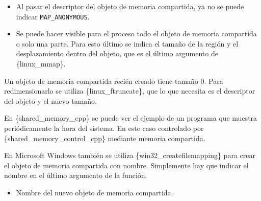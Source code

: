 \begin{itemize}
\item
  Al pasar el descriptor del objeto de memoria compartida, ya no se
  puede indicar \texttt{MAP\_ANONYMOUS}.
\item
  Se puede hacer visible para el proceso todo el objeto de memoria
  compartida o solo una parte. Para esto último se indica el tamaño de
  la región y el desplazamiento dentro del objeto, que es el último
  argumento de \{linux\_mmap\}.
\end{itemize}

Un objeto de memoria compartida recién creado tiene tamaño 0. Para
redimensionarlo se utiliza \{linux\_ftruncate\}, que lo que necesita es
el descriptor del objeto y el nuevo tamaño.

En \{shared\_memory\_cpp\} se puede ver el ejemplo de un programa que
muestra periódicamente la hora del sistema. En este caso controlado por
\{shared\_memory\_control\_cpp\} mediante memoria compartida.

En Microsoft Windows también se utiliza \{win32\_createfilemapping\}
para crear el objeto de memoria compartida con nombre. Simplemente hay
que indicar el nombre en el último argumento de la función.

\begin{Shaded}
\begin{Highlighting}[]
\OperatorTok{=}\OperatorTok{(}
\OperatorTok{,}
\OperatorTok{,}
\OperatorTok{,}
    \OperatorTok{,}
\OperatorTok{,}
    \SpecialCharTok{\textbackslash{}\textbackslash{}} 
\OperatorTok{);}
\end{Highlighting}
\end{Shaded}

\begin{itemize}
\item
  Nombre del nuevo objeto de memoria compartida.
\end{itemize}
